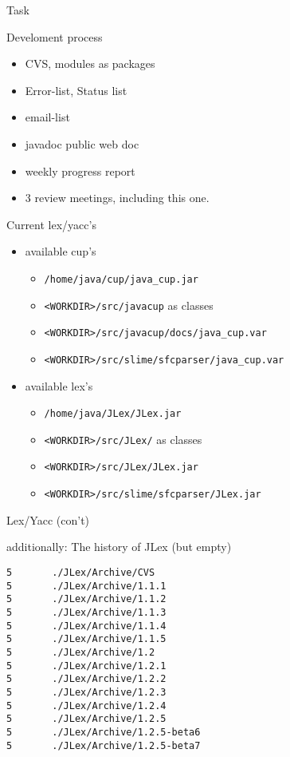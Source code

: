 

\begin{myslide}{Task}
  
\end{myslide}


\begin{myslide}{Develoment process}
  \begin{itemize}
  \item CVS, modules as packages
  \item Error-list, Status list
  \item email-list
  \item javadoc public web doc
  \item weekly progress report
  \item 3 review meetings, including this one. 
  \end{itemize}
\end{myslide}


\begin{myslide}{Current lex/yacc's}
  \begin{itemize}
  \item available cup's
    \begin{itemize}
    \item \verb+/home/java/cup/java_cup.jar+
    \item \verb+<WORKDIR>/src/javacup+ as classes
    \item \verb+<WORKDIR>/src/javacup/docs/java_cup.var+ 
    \item \verb+<WORKDIR>/src/slime/sfcparser/java_cup.var+ 
    \end{itemize}
  \item available lex's
    \begin{itemize}
    \item \verb+/home/java/JLex/JLex.jar+
    \item \verb+<WORKDIR>/src/JLex/+ as classes
    \item \verb+<WORKDIR>/src/JLex/JLex.jar+
    \item \verb+<WORKDIR>/src/slime/sfcparser/JLex.jar+ 
    \end{itemize}
  \end{itemize}
\end{myslide}

\begin{myslide}{Lex/Yacc (con't)}
    
additionally: The history of JLex (but empty)

\begin{verbatim}
5       ./JLex/Archive/CVS
5       ./JLex/Archive/1.1.1
5       ./JLex/Archive/1.1.2
5       ./JLex/Archive/1.1.3
5       ./JLex/Archive/1.1.4
5       ./JLex/Archive/1.1.5
5       ./JLex/Archive/1.2
5       ./JLex/Archive/1.2.1
5       ./JLex/Archive/1.2.2
5       ./JLex/Archive/1.2.3
5       ./JLex/Archive/1.2.4
5       ./JLex/Archive/1.2.5
5       ./JLex/Archive/1.2.5-beta6
5       ./JLex/Archive/1.2.5-beta7
\end{verbatim}
    
\end{myslide}  

